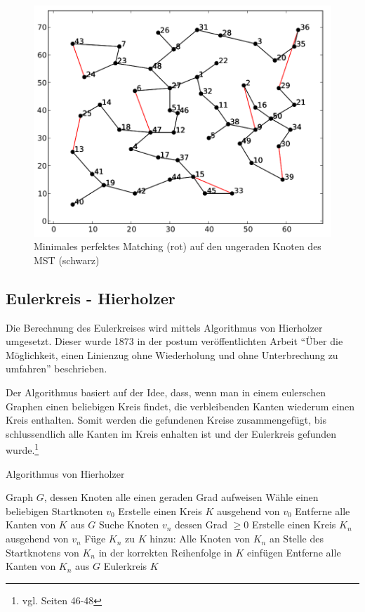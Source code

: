 \documentclass[11pt,a4paper]{article}
\begin{document}
\begin{figure}[H]
        \centering
        \includegraphics[width=12cm]{gfx/eil51_pm}
        \caption{Minimales perfektes Matching (rot) auf den ungeraden Knoten des MST (schwarz)}
        \label{img:eil51_pm}
\end{figure}

\newpage

\subsection{Eulerkreis - Hierholzer}
Die Berechnung des Eulerkreises wird mittels Algorithmus von Hierholzer umgesetzt. Dieser wurde 1873 in der postum veröffentlichten Arbeit "`Über die Möglichkeit, einen Linienzug ohne Wiederholung und ohne Unterbrechung zu umfahren"'\cite{hierholzer73} beschrieben.

Der Algorithmus basiert auf der Idee, dass, wenn man in einem eulerschen Graphen einen beliebigen Kreis findet, die verbleibenden Kanten wiederum einen Kreis enthalten. Somit werden die gefundenen Kreise zusammengefügt, bis schlussendlich alle Kanten im Kreis enhalten ist und der Eulerkreis gefunden wurde.\footnote{vgl. \cite{krumke05} Seiten 46-48}

\begin{algorithm}[H]
    \renewcommand{\algorithmicrequire}{\textbf{Eingabe:}}
    \renewcommand{\algorithmicensure}{\textbf{Ausgabe:}}
    \caption{Algorithmus von Hierholzer}

    \begin{algorithmic}[1]
    \REQUIRE Graph $G$, dessen Knoten alle einen geraden Grad aufweisen
        \STATE Wähle einen beliebigen Startknoten $v_0$
        \STATE Erstelle einen Kreis $K$ ausgehend von $v_0$
        \STATE Entferne alle Kanten von $K$ aus $G$
            \STATE Suche Knoten $v_n$ dessen Grad $\ge 0$
            \STATE Erstelle einen Kreis $K_n$ ausgehend von $v_n$
            \STATE Füge $K_n$ zu $K$ hinzu: Alle Knoten von $K_n$ an Stelle des Startknotens von $K_n$ in der korrekten Reihenfolge in $K$ einfügen
            \STATE Entferne alle Kanten von $K_n$ aus $G$
        \ENDWHILE
    \ENSURE Eulerkreis $K$
    \end{algorithmic}
\end{algorithm}
\end{document}
